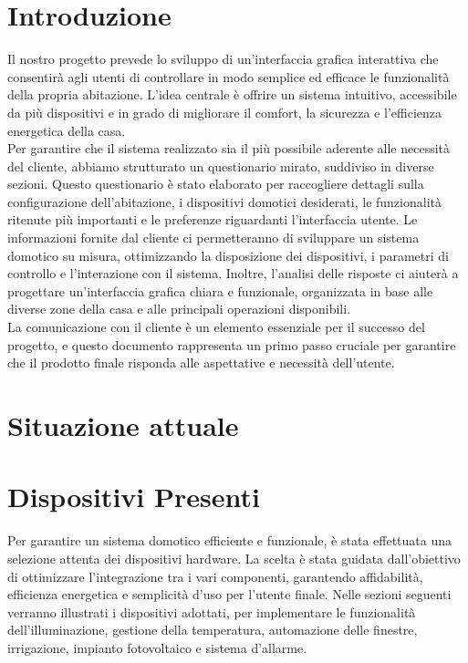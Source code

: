 \documentclass[italian, 12pt, a4paper]{article}
\begin{document}
\section{Introduzione}\label{sec:introduzione}
Il nostro progetto prevede lo sviluppo di un’interfaccia grafica interattiva che consentirà agli utenti di controllare in modo semplice ed efficace le funzionalità della propria abitazione. L’idea centrale è offrire un sistema intuitivo, accessibile da più dispositivi e in grado di migliorare il comfort, la sicurezza e l’efficienza energetica della casa.\\[1.5mm]
Per garantire che il sistema realizzato sia il più possibile aderente alle necessità del cliente, abbiamo strutturato un questionario mirato, suddiviso in diverse sezioni. Questo questionario è stato elaborato per raccogliere dettagli sulla configurazione dell’abitazione, i dispositivi domotici desiderati, le funzionalità ritenute più importanti e le preferenze riguardanti l’interfaccia utente.
Le informazioni fornite dal cliente ci permetteranno di sviluppare un sistema domotico su misura, ottimizzando la disposizione dei dispositivi, i parametri di controllo e l’interazione con il sistema. Inoltre, l’analisi delle risposte ci aiuterà a progettare un’interfaccia grafica chiara e funzionale, organizzata in base alle diverse zone della casa e alle principali operazioni disponibili.\\[1.5mm]
La comunicazione con il cliente è un elemento essenziale per il successo del progetto, e questo documento rappresenta un primo passo cruciale per garantire che il prodotto finale risponda alle aspettative e necessità dell’utente.
\clearpage
\section{Situazione attuale}\label{sec:situazione}
\section{Dispositivi Presenti}
Per garantire un sistema domotico efficiente e funzionale, è stata effettuata una selezione attenta dei dispositivi hardware. La scelta è stata guidata dall’obiettivo di ottimizzare l’integrazione tra i vari componenti, garantendo affidabilità, efficienza energetica e semplicità d’uso per l’utente finale.
Nelle sezioni seguenti verranno illustrati i dispositivi adottati, per implementare le funzionalità dell'illuminazione, gestione della temperatura, automazione delle finestre, irrigazione, impianto fotovoltaico e sistema d'allarme.
\end{document}
